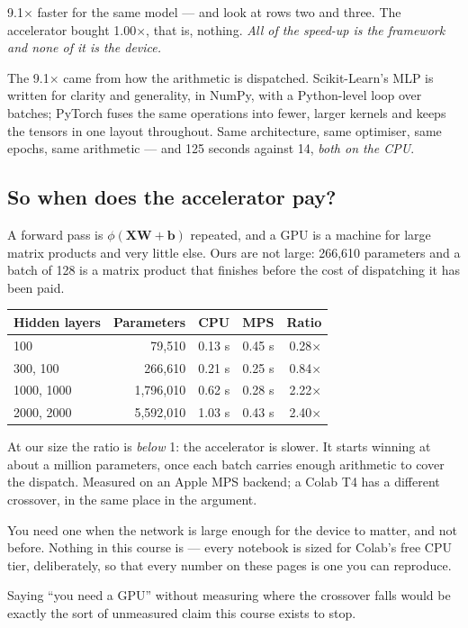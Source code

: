 \documentclass[11pt,a4paper]{article}
\begin{document}
9.1$\times$ faster for the same model --- and look at rows two and three. The
accelerator bought 1.00$\times$, that is, nothing. \emph{All of the speed-up is
the framework and none of it is the device.}

The 9.1$\times$ came from how the arithmetic is dispatched. Scikit-Learn's MLP
is written for clarity and generality, in NumPy, with a Python-level loop over
batches; PyTorch fuses the same operations into fewer, larger kernels and keeps
the tensors in one layout throughout. Same architecture, same optimiser, same
epochs, same arithmetic --- and 125 seconds against 14, \emph{both on the CPU}.

\subsection{So when does the accelerator pay?}

A forward pass is $\phi(\mathbf{X}\mathbf{W} + \mathbf{b})$ repeated, and a GPU
is a machine for large matrix products and very little else. Ours are not
large: 266{,}610 parameters and a batch of 128 is a matrix product that
finishes before the cost of dispatching it has been paid.

\begin{center}
\small
\begin{tabular}{lrrrr}
\toprule
\textbf{Hidden layers} & \textbf{Parameters} & \textbf{CPU} & \textbf{MPS} &
\textbf{Ratio} \\
\midrule
100        &    79{,}510 & 0.13 s & 0.45 s & 0.28$\times$ \\
300, 100   &   266{,}610 & 0.21 s & 0.25 s & 0.84$\times$ \\
1000, 1000 & 1{,}796{,}010 & 0.62 s & 0.28 s & 2.22$\times$ \\
2000, 2000 & 5{,}592{,}010 & 1.03 s & 0.43 s & 2.40$\times$ \\
\bottomrule
\end{tabular}
\end{center}

At our size the ratio is \emph{below} 1: the accelerator is slower. It starts
winning at about a million parameters, once each batch carries enough
arithmetic to cover the dispatch. Measured on an Apple MPS backend; a Colab T4
has a different crossover, in the same place in the argument.

\begin{keybox}[title={The honest version of ``you need a GPU''}]
You need one when the network is large enough for the device to matter, and not
before. Nothing in this course is --- every notebook is sized for Colab's free
CPU tier, deliberately, so that every number on these pages is one you can
reproduce.

Saying ``you need a GPU'' without measuring where the crossover falls would be
exactly the sort of unmeasured claim this course exists to stop.
\end{keybox}
\end{document}
